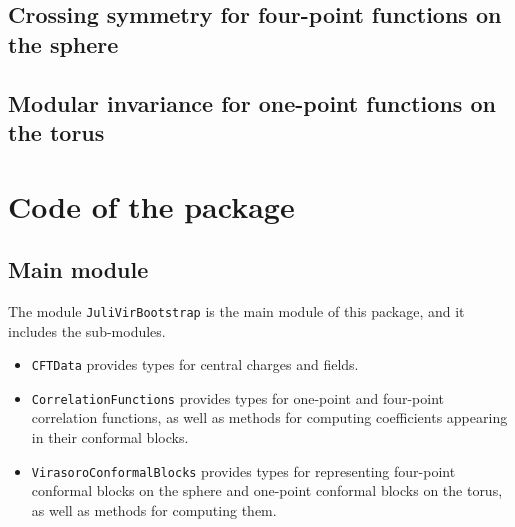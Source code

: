 \documentclass[a4paper]{article}
\numberwithin{equation}{section}
\begin{document}
\subsection{Crossing symmetry for four-point functions on the sphere}
\label{sec:org69236ad}

\subsection{Modular invariance for one-point functions on the torus}
\label{sec:org8f01574}
\section{Code of the package}
\label{sec:orgefbde10}

\subsection{Main module}
\label{sec:org4900318}
The module \texttt{JuliVirBootstrap} is the main module of this package, and it includes the sub-modules.

\begin{itemize}
\item \texttt{CFTData} provides types for central charges and fields.
\item \texttt{CorrelationFunctions} provides types for one-point and four-point correlation functions, as well as methods for computing coefficients appearing in their conformal blocks.
\item \texttt{VirasoroConformalBlocks} provides types for representing four-point conformal blocks on the sphere and one-point conformal blocks on the torus, as well as methods for computing them.
\end{itemize}
\end{document}
